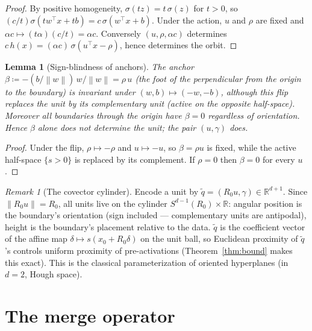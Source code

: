 \documentclass[11pt]{article}
\newtheorem{lemma}[theorem]{Lemma}
\theoremstyle{remark}
\newtheorem{remark}[theorem]{Remark}
\newcommand{\R}{\mathbb{R}}
\newcommand{\relu}{\sigma}
\newcommand{\norm}[1]{\left\lVert #1 \right\rVert}
\begin{document}
\begin{proof}
By positive homogeneity, $\relu(t z) = t\,\relu(z)$ for $t > 0$, so
$(c/t)\relu(tw^\top x + tb) = c\,\relu(w^\top x + b)$. Under the action,
$u$ and $\rho$ are fixed and $\alpha c \mapsto (t\alpha)(c/t) = \alpha c$.
Conversely $(u,\rho,\alpha c)$ determines $c\,h(x) =
(\alpha c)\,\relu(u^\top x - \rho)$, hence determines the orbit.
\end{proof}

\begin{lemma}[Sign-blindness of anchors]\label{lem:anchor}
The anchor $\beta \coloneqq -(b/\norm{w})\, w/\norm{w} = \rho\, u$ (the foot of
the perpendicular from the origin to the boundary) is invariant under
$(w,b)\mapsto(-w,-b)$, although this flip replaces the unit by its
complementary unit (active on the opposite half-space). Moreover all
boundaries through the origin have $\beta = 0$ regardless of orientation.
Hence $\beta$ alone does not determine the unit; the pair $(u,\gamma)$ does.
\end{lemma}

\begin{proof}
Under the flip, $\rho \mapsto -\rho$ and $u \mapsto -u$, so
$\beta = \rho u$ is fixed, while the active half-space
$\{s > 0\}$ is replaced by its complement. If $\rho = 0$ then $\beta = 0$ for
every $u$.
\end{proof}

\begin{remark}[The covector cylinder]\label{rem:cylinder}
Encode a unit by $\tilde q = (R_0 u, \gamma) \in \R^{d+1}$. Since
$\norm{R_0 u} = R_0$, all units live on the cylinder
$S^{d-1}(R_0)\times\R$: angular position is the boundary's orientation
(sign included --- complementary units are antipodal), height is the
boundary's placement relative to the data. $\tilde q$ is the coefficient
vector of the affine map $\delta \mapsto s(x_0 + R_0\delta)$ on the unit
ball, so Euclidean proximity of $\tilde q$'s controls uniform proximity of
pre-activations (Theorem~\ref{thm:bound} makes this exact). This is the
classical parameterization of oriented hyperplanes (in $d=2$, Hough space).
\end{remark}

\section{The merge operator}\label{sec:merge}
\end{document}
